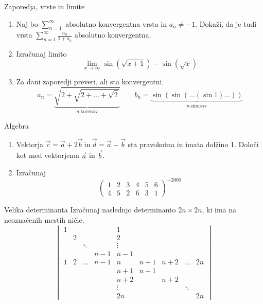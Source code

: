 \begin{frame}{Zaporedja, vrste in limite}
	\begin{enumerate}
		\item 
		Naj bo \(\sum_{n=1}^{\infty}\) absolutno konvergentna vrsta in $a_n \ne -1$.
		Dokaži, da je tudi vrsta $\sum_{n=1}^\infty \frac{a_n}{1+a_n}$
		absolutno konvergentna.

		\item
		Izračunaj limito
		\[
		 \lim_{x \to \infty} {\sin(\sqrt{x+1}) - \sin(\sqrt{x})}
		 \]

		\item
		Za dani zaporedji preveri, ali sta konvergentni.
		$$
		a_n = \underbrace{\sqrt{2+\sqrt{2+\dots+\sqrt{2}}}}_{n~\text{korenov}} \qquad
		b_n = \underbrace{\sin(\sin(\dots(\sin 1)\dots))}_{n~\text{sinusov}}
		$$
	\end{enumerate}
\end{frame}

\begin{frame}{Algebra}
	\begin{enumerate}
		\item
		Vektorja $\vec{c} = \vec{a} + 2\vec{b}~\text{in}~\vec{d} = \vec{a} - \vec{b}$ 
		sta pravokotna in imata dolžino 1. Določi kot med vektorjema $\vec{a}$ in $\vec{b}$.
		\item 
		Izračunaj
		$$\displaystyle{\begin{pmatrix}1&2&3&4&5&6 \\ 4&5&2&6&3&1 \end{pmatrix}^{-2000}}$$
	\end{enumerate}
\end{frame}

\begin{frame}{Velika determinanta}
	Izračunaj naslednjo determinanto $2n \times 2n$, ki ima na neoznačenih mestih ničle.
	$$
	\begin{vmatrix}
		1 &&&& 1 &&&& \\
		& 2 &&& 2 &&&& \\
		&& \ddots && \vdots &&&& \\
		&&& n-1 & n-1 &&&& \\
		1 & 2 & \ldots & n-1 & n & n+1 & n+2 & \ldots & 2n \\
		&&&& n+1 & n+1 &&& \\
		&&&& n+2 && n+2 && \\
		&&&& \vdots &&& \ddots & \\
		&&&& 2n &&&& 2n
	\end{vmatrix}
	$$
\end{frame}

